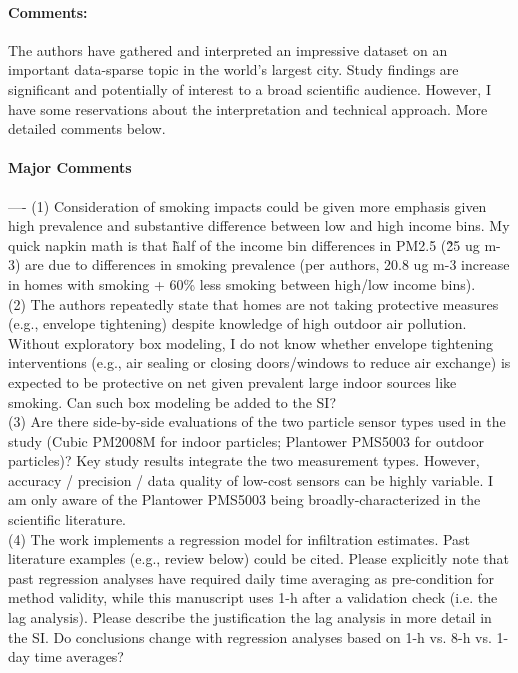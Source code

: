 \documentclass[12pt,english]{article}
\begin{document}
\paragraph{Comments:}
The authors have gathered and interpreted an impressive dataset on an important data-sparse topic in the world's largest city. Study findings are significant and potentially of interest to a broad scientific audience. However, I have some reservations about the interpretation and technical approach. More detailed comments below.

\paragraph{Major Comments}
----
(1) Consideration of smoking impacts could be given more emphasis given high prevalence and substantive difference between low and high income bins. My quick napkin math is that \~half of the income bin differences in PM2.5 (\~25 ug m-3) are due to differences in smoking prevalence (per authors, 20.8 ug m-3 increase in homes with smoking + 60\% less smoking between high/low income bins).
\\
(2) The authors repeatedly state that homes are not taking protective measures (e.g., envelope tightening) despite knowledge of high outdoor air pollution. Without exploratory box modeling, I do not know whether envelope tightening interventions (e.g., air sealing or closing doors/windows to reduce air exchange) is expected to be protective on net given prevalent large indoor sources like smoking. Can such box modeling be added to the SI?
\\
(3) Are there side-by-side evaluations of the two particle sensor types used in the study (Cubic PM2008M for indoor particles; Plantower PMS5003 for outdoor particles)? Key study results integrate the two measurement types. However, accuracy / precision / data quality of low-cost sensors can be highly variable. I am only aware of the Plantower PMS5003 being broadly-characterized in the scientific literature.
\\
(4) The work implements a regression model for infiltration estimates. Past literature examples (e.g., review below) could be cited. Please explicitly note that past regression analyses have required daily time averaging as pre-condition for method validity, while this manuscript uses 1-h after a validation check (i.e. the lag analysis). Please describe the justification the lag analysis in more detail in the SI. Do conclusions change with regression analyses based on 1-h vs. 8-h vs. 1-day time averages?
\end{document}
